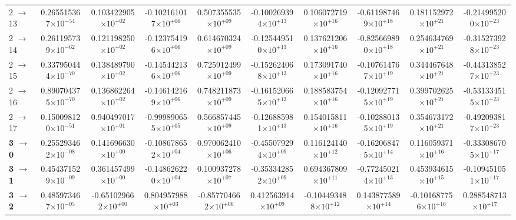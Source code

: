 \documentclass[reviewcopy]{elsarticle}
\begin{document}
\begin{landscape}
\begin{longtable}{lccccccccc}
2 $\to$ 13  & 0.265515367$\times10^{-54}$  & 0.103422905$\times10^{+02}$  & -0.102161017$\times10^{+06}$  & 0.507355535$\times10^{+09}$  & -0.100269394$\times10^{+13}$  & 0.106072719$\times10^{+16}$  & -0.611987469$\times10^{+18}$  & 0.181152972$\times10^{+21}$  & -0.214995200$\times10^{+23}$ \\
2 $\to$ 14  & 0.261195739$\times10^{-62}$  & 0.121198250$\times10^{+02}$  & -0.123754196$\times10^{+06}$  & 0.614670324$\times10^{+09}$  & -0.125449510$\times10^{+13}$  & 0.137621206$\times10^{+16}$  & -0.825669890$\times10^{+18}$  & 0.254634769$\times10^{+21}$  & -0.315273928$\times10^{+23}$ \\
2 $\to$ 15  & 0.337950444$\times10^{-70}$  & 0.138489790$\times10^{+02}$  & -0.145442136$\times10^{+06}$  & 0.725912499$\times10^{+09}$  & -0.152624068$\times10^{+13}$  & 0.173091740$\times10^{+16}$  & -0.107614767$\times10^{+19}$  & 0.344467648$\times10^{+21}$  & -0.443138527$\times10^{+23}$ \\
2 $\to$ 16  & 0.890704375$\times10^{-70}$  & 0.136862264$\times10^{+02}$  & -0.146142169$\times10^{+06}$  & 0.748211873$\times10^{+09}$  & -0.161520665$\times10^{+13}$  & 0.188583754$\times10^{+16}$  & -0.120927715$\times10^{+19}$  & 0.399702625$\times10^{+21}$  & -0.531334515$\times10^{+23}$ \\
2 $\to$ 17  & 0.150098120$\times10^{-51}$  & 0.940497017$\times10^{+01}$  & -0.999890655$\times10^{+05}$  & 0.566857445$\times10^{+09}$  & -0.126885981$\times10^{+13}$  & 0.154015811$\times10^{+16}$  & -0.102880135$\times10^{+19}$  & 0.354673172$\times10^{+21}$  & -0.492093817$\times10^{+23}$ \\[7pt]
{\bf 3 $\to$ 0}  & 0.255293462$\times10^{-08}$  & 0.141696630$\times10^{+00}$  & -0.108678652$\times10^{+04}$  & 0.970062410$\times10^{+06}$  & -0.455079294$\times10^{+09}$  & 0.116124140$\times10^{+12}$  & -0.162068475$\times10^{+14}$  & 0.116059371$\times10^{+16}$  & -0.333086705$\times10^{+17}$ \\
{\bf 3 $\to$ 1}  & 0.454371529$\times10^{-09}$  & 0.361457499$\times10^{+00}$  & -0.148626220$\times10^{+04}$  & 0.100937278$\times10^{+07}$  & -0.353342852$\times10^{+09}$  & 0.694367809$\times10^{+11}$  & -0.772450214$\times10^{+13}$  & 0.453934615$\times10^{+15}$  & -0.109451051$\times10^{+17}$ \\
{\bf 3 $\to$ 2}  & 0.485973467$\times10^{-05}$  & -0.651029662$\times10^{+00}$  & 0.804957988$\times10^{+03}$  & -0.857704662$\times10^{+06}$  & 0.412563914$\times10^{+09}$  & -0.104493488$\times10^{+12}$  & 0.143877589$\times10^{+14}$  & -0.101687756$\times10^{+16}$  & 0.288548713$\times10^{+17}$ \\

\end{longtable}
\end{landscape}
\end{document}
